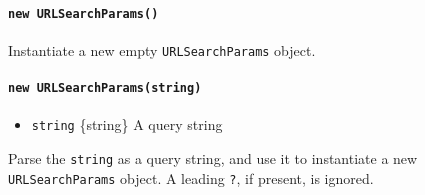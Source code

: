 \begin{Shaded}
\begin{Highlighting}[]
 \OperatorTok{=}\OperatorTok{;}
\NormalTok{)}\OperatorTok{;}
\NormalTok{(}\NormalTok{)}\OperatorTok{;}
\NormalTok{)}\OperatorTok{;}
\end{Highlighting}
\end{Shaded}

\paragraph{\texorpdfstring{\texttt{new\ URLSearchParams()}}{new URLSearchParams()}}\label{new-urlsearchparams}

Instantiate a new empty \texttt{URLSearchParams} object.

\paragraph{\texorpdfstring{\texttt{new\ URLSearchParams(string)}}{new URLSearchParams(string)}}\label{new-urlsearchparamsstring}

\begin{itemize}
\tightlist
\item
  \texttt{string} \{string\} A query string
\end{itemize}

Parse the \texttt{string} as a query string, and use it to instantiate a
new \texttt{URLSearchParams} object. A leading
\texttt{\textquotesingle{}?\textquotesingle{}}, if present, is ignored.

